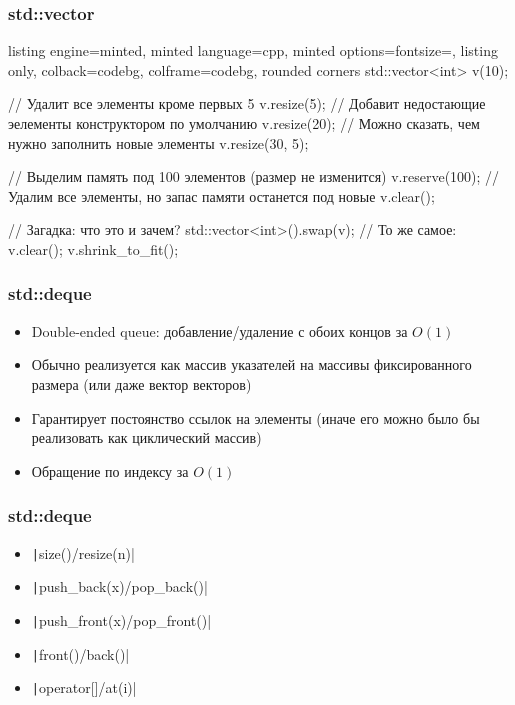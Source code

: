\documentclass[10pt]{beamer}
\begin{document}
\begin{frame}[fragile]
\frametitle{std::vector}
\begin{itemize}
\begin{tcblisting}{listing engine=minted, minted language=cpp, minted options={fontsize=\scriptsize}, listing only, colback=codebg, colframe=codebg, rounded corners}
std::vector<int> v(10);

// Удалит все элементы кроме первых 5
v.resize(5);
// Добавит недостающие эелементы конструктором по умолчанию
v.resize(20);
// Можно сказать, чем нужно заполнить новые элементы
v.resize(30, 5);

// Выделим память под 100 элементов (размер не изменится)
v.reserve(100);
// Удалим все элементы, но запас памяти останется под новые
v.clear();

// Загадка: что это и зачем?
std::vector<int>().swap(v);
// То же самое:
v.clear(); v.shrink_to_fit();
\end{tcblisting}
\end{itemize}
\end{frame}

\begin{frame}[fragile]
\frametitle{std::deque}
\begin{itemize}
\item Double-ended queue: добавление/удаление с обоих концов за \(O(1)\)
\pause
\item Обычно реализуется как массив указателей на массивы фиксированного размера (или даже вектор векторов)
\pause
\item Гарантирует постоянство ссылок на элементы (иначе его можно было бы реализовать как циклический массив)
\pause
\item Обращение по индексу за \(O(1)\)
\end{itemize}
\end{frame}

\begin{frame}[fragile]
\frametitle{std::deque}
\begin{itemize}
\item \texttt|size()/resize(n)|
\pause
\item \texttt|push_back(x)/pop_back()|
\pause
\item \texttt|push_front(x)/pop_front()|
\pause
\item \texttt|front()/back()|
\pause
\item \texttt|operator[]/at(i)|
\end{itemize}
\end{frame}
\end{document}
